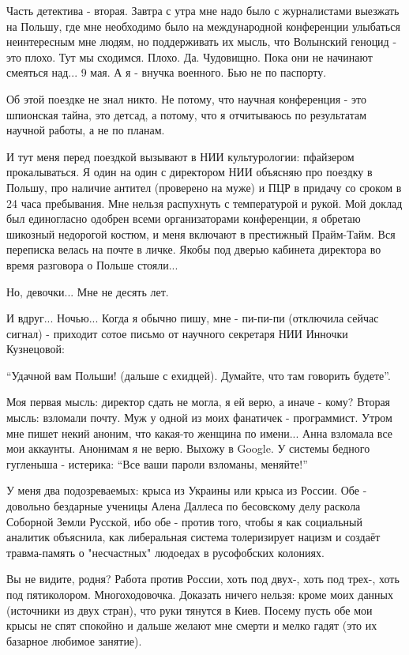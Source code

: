 Часть детектива - вторая. Завтра с утра мне надо было с журналистами выезжать
на Польшу, где мне необходимо было на международной конференции улыбаться
неинтересным мне людям, но поддерживать их мысль, что Волынский геноцид - это
плохо. Тут мы сходимся. Плохо. Да. Чудовищно. Пока они не начинают смеяться
над... 9 мая. А я - внучка военного. Бью не по паспорту.

Об этой поездке не знал никто. Не потому, что научная конференция - это
шпионская тайна, это детсад, а потому, что я отчитываюсь по результатам научной
работы, а не по планам. 

И тут меня перед поездкой вызывают в НИИ культурологии: пфайзером
прокалываться. Я один на один с директором НИИ объясняю про поездку в Польшу,
про наличие антител (проверено на муже) и ПЦР в придачу со сроком в 24 часа
пребывания. Мне нельзя распухнуть с температурой и рукой. Мой доклад был
единогласно одобрен всеми организаторами конференции, я обретаю шикозный
недорогой костюм, и меня включают  в престижный Прайм-Тайм. Вся переписка
велась на почте в личке. Якобы под дверью кабинета директора во время разговора
о Польше стояли... 

Но, девочки... Мне не десять лет.

И вдруг... Ночью... Когда я обычно пишу, мне - пи-пи-пи (отключила сейчас
сигнал) - приходит сотое письмо от научного секретаря НИИ Инночки Кузнецовой: 

\enquote{Удачной вам Польши! (дальше с ехидцей). Думайте, что там говорить будете}.

Моя первая мысль: директор сдать не могла, я ей верю, а иначе - кому? Вторая
мысль: взломали почту. Муж у одной из моих фанатичек - программист. Утром мне
пишет некий аноним, что какая-то женщина по имени... Анна взломала все мои
аккаунты. Анонимам я не верю. Выхожу в Google. У системы бедного гугленыша -
истерика: \enquote{Все ваши пароли взломаны, меняйте!}

У меня два подозреваемых: крыса из Украины или крыса из России. Обе - довольно
бездарные ученицы Алена Даллеса по бесовскому делу раскола Соборной Земли
Русской, ибо обе - против того, чтобы я как социальный аналитик объяснила, как
либеральная система толеризирует нацизм и создаёт травма-память о "несчастных"
людоедах в русофобских колониях. 

Вы не видите, родня? Работа против России, хоть под двух-, хоть под трех-, хоть
под пятиколором. Многоходовочка. Доказать ничего нельзя: кроме моих данных
(источники из двух стран), что руки тянутся в Киев. Посему пусть обе мои крысы
не спят спокойно и дальше желают мне смерти и мелко гадят (это их базарное
любимое занятие).

